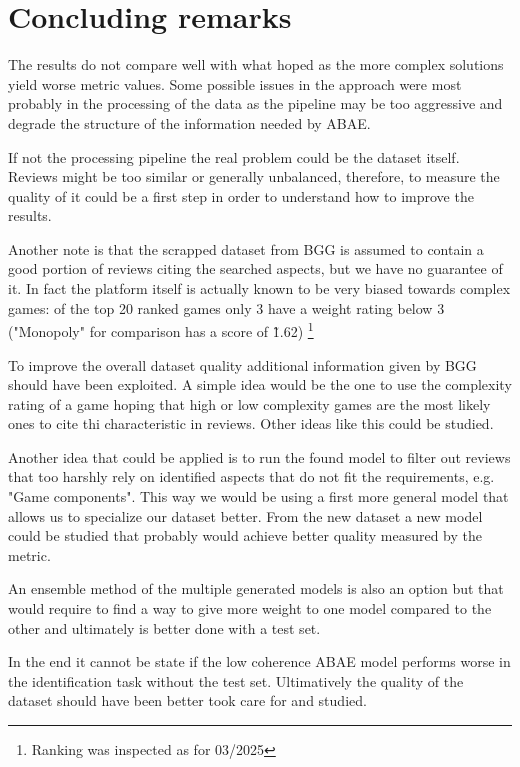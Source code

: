 \section{Concluding remarks}
The results do not compare well with what hoped as the more complex solutions yield worse metric values.
Some possible issues in the approach were most probably in the processing of the data as the pipeline may be
too aggressive and degrade the structure of the information needed by ABAE.

If not the processing pipeline the real problem could be the dataset itself.
Reviews might be too similar or generally unbalanced, therefore, to measure the quality of it could
be a first step in order to understand how to improve the results.

Another note is that the scrapped dataset from BGG is assumed to contain a good portion of reviews citing
the searched aspects, but we have no guarantee of it.
In fact the platform itself is actually known to be very biased towards complex games: of the top 20 ranked
games only 3 have a weight rating below 3 ("Monopoly" for comparison has a score of \~1.62)
\footnote{Ranking was inspected as for 03/2025}

To improve the overall dataset quality additional information given by BGG should have been exploited.
A simple idea would be the one to use the complexity rating of a game hoping that high or low complexity games
are the most likely ones to cite thi characteristic in reviews.
Other ideas like this could be studied.

Another idea that could be applied is to run the found model to filter out reviews that too harshly rely
on identified aspects that do not fit the requirements, e.g. "Game components".
This way we would be using a first more general model that allows us to specialize our dataset better.
From the new dataset a new model could be studied that probably would achieve better quality measured by the metric.

An ensemble method of the multiple generated models is also an option but that would require to find a way to give more
weight to one model compared to the other and ultimately is better done with a test set.

In the end it cannot be state if the low coherence ABAE model performs worse in the identification task
without the test set.
Ultimatively the quality of the dataset should have been better took care for and studied.

